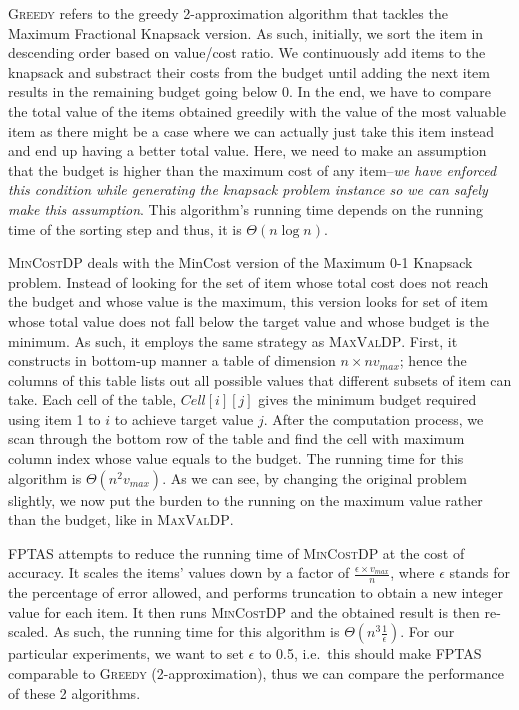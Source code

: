 \documentclass[12pt, oneside]{book}
\begin{document}
\textsc{Greedy} refers to the greedy 2-approximation algorithm that
tackles the Maximum Fractional Knapsack version. As such, initially, we
sort the item in descending order based on value/cost ratio. We
continuously add items to the knapsack and substract their costs from
the budget until adding the next item results in the remaining budget
going below 0. In the end, we have to compare the total value of the
items obtained greedily with the value of the most valuable item as
there might be a case where we can actually just take this item instead
and end up having a better total value. Here, we need to make an
assumption that the budget is higher than the maximum cost of any
item--\emph{we have enforced this condition while generating the
knapsack problem instance so we can safely make this assumption}. This
algorithm's running time depends on the running time of the sorting step
and thus, it is \(\Theta(n\log{n})\).

\textsc{MinCostDP} deals with the MinCost version of the Maximum 0-1
Knapsack problem. Instead of looking for the set of item whose total
cost does not reach the budget and whose value is the maximum, this
version looks for set of item whose total value does not fall below the
target value and whose budget is the minimum. As such, it employs the
same strategy as \textsc{MaxValDP}. First, it constructs in bottom-up
manner a table of dimension \(n \times nv_{max}\); hence the columns of
this table lists out all possible values that different subsets of item
can take. Each cell of the table, \(Cell[i][j]\) gives the minimum
budget required using item 1 to \(i\) to achieve target value \(j\).
After the computation process, we scan through the bottom row of the
table and find the cell with maximum column index whose value equals to
the budget. The running time for this algorithm is
\(\Theta(n^2v_{max})\). As we can see, by changing the original problem
slightly, we now put the burden to the running on the maximum value
rather than the budget, like in \textsc{MaxValDP}.

\textsc{FPTAS} attempts to reduce the running time of \textsc{MinCostDP}
at the cost of accuracy. It scales the items' values down by a factor of
\(\frac{\epsilon \times v_{max}}{n}\), where \(\epsilon\) stands for the
percentage of error allowed, and performs truncation to obtain a new
integer value for each item. It then runs \textsc{MinCostDP} and the
obtained result is then re-scaled. As such, the running time for this
algorithm is \(\Theta(n^3\frac{1}{\epsilon})\). For our particular
experiments, we want to set \(\epsilon\) to 0.5, i.e.~this should make
\textsc{FPTAS} comparable to \textsc{Greedy} (2-approximation), thus we
can compare the performance of these 2 algorithms.
\end{document}

